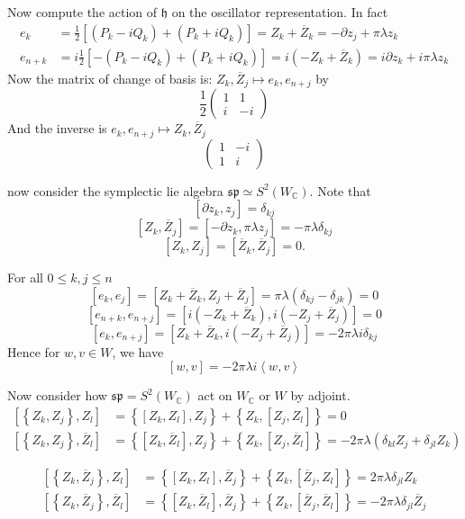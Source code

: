 \documentclass[12pt]{amsart}
\def\bC{{\mathbb{C}}}
\def\sp{{\mathfrak{sp}}}
\def\inn#1#2{\left\langle{#1},{#2}\right\rangle}
\def\barZ{{\overline{Z}}}
\def\fhh{\mathfrak{h}}
\def\pz#1{\partial z_{#1}}
\def\cmm#1#2{\left[{#1},{#2}\right]}
\def\acmm#1#2{\left\{{#1},{#2}\right\}}
\begin{document}
Now compute the action of $\fhh$ on the oscillator representation. 
In fact 
\[
\begin{split}
e_k &= \frac{1}{2}[(P_k-iQ_k) + (P_k + iQ_k)] =
Z_k + \barZ_k =  -\pz{j}  + \pi \lambda z_k\\
e_{n+k} & = i\frac{1}{2}[-(P_k-iQ_k) + (P_k + iQ_k)] = i(-Z_k+\barZ_k)
= i\pz{k} +i \pi \lambda z_k
\end{split}
\]
Now the matrix of change of basis is: $Z_k, \barZ_j \mapsto e_k, e_{n+j}$
by 
\begin{equation}\label{eq:tZtoe}
\frac{1}{2}\begin{pmatrix}
1 & 1\\
i & -i 
\end{pmatrix}
\end{equation}
And the inverse is $e_k, e_{n+j} \mapsto Z_k, \barZ_j$
\[
\begin{pmatrix}
1 & -i\\
1 & i
\end{pmatrix}
\]

now consider the symplectic lie algebra $\sp \simeq S^2(W_\bC)$. 
Note that 
\[
\cmm{\pz{k}}{z_j} = \delta_{kj}
\]
\[
\cmm{Z_k}{\barZ_j} = \cmm{-\pz{k}}{\pi \lambda z_j} = -\pi\lambda \delta_{kj}
\]
\[
\cmm{Z_k}{Z_j} = \cmm{\barZ_k}{\barZ_j} =0.
\]

For all $0\leq k,j \leq n$
\[
\cmm{e_k}{e_{j}}= \cmm{Z_k+\barZ_k}{Z_j+\barZ_j} = \pi\lambda (\delta_{kj}-\delta_{jk}) 
=0 
\]
\[
\cmm{e_{n+k}}{e_{n+j}} = \cmm{i(-Z_k+\barZ_k)}{i(-Z_j+\barZ_j)} = 0
\]
\[
\cmm{e_k}{e_{n+j}} = \cmm{Z_k + \barZ_k}{i(-Z_j+\barZ_j)} = -2\pi\lambda i \delta_{kj} 
\]
Hence for $w,v\in W$, we have 
\[
\cmm{w}{v}= - 2\pi \lambda i \inn{w}{v} 
\]

Now consider how $\sp = S^2(W_\bC)$ act on $W_\bC$ or $W$ by adjoint.
\begin{align*}
\cmm{\acmm{Z_k}{Z_j}}{Z_l} &= \acmm{\cmm{Z_k}{Z_l}}{Z_j} 
+ \acmm{Z_k}{\cmm{Z_j}{Z_l}} = 0\\
\cmm{\acmm{Z_k}{Z_j}}{\barZ_l} &= \acmm{\cmm{Z_k}{\barZ_l}}{Z_j} 
+ \acmm{Z_k}{\cmm{Z_j}{\barZ_l}} = -2\pi \lambda(\delta_{kl}Z_j+\delta_{jl}Z_k)
\end{align*}

\begin{align*}
 \cmm{\acmm{Z_k}{\barZ_j}}{Z_l} &= \acmm{\cmm{Z_k}{Z_l}}{\barZ_j} 
+ \acmm{Z_k}{\cmm{\barZ_j}{Z_l}} = 2\pi \lambda \delta_{jl} Z_k\\
 \cmm{\acmm{Z_k}{\barZ_j}}{\barZ_l} &= \acmm{\cmm{Z_k}{\barZ_l}}{\barZ_j} 
+ \acmm{Z_k}{\cmm{\barZ_j}{\barZ_l}} = -2\pi \lambda \delta_{jl} \barZ_j
\end{align*}
\end{document}
